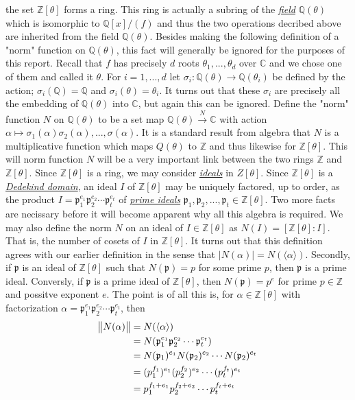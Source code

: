 \documentclass[10pt,a4paper]{article}
\theoremstyle{plain}
\theoremstyle{definition}
\theoremstyle{remark}
\newcommand{\Q}{\mathbb{Q}}
\newcommand{\Z}{\mathbb{Z}}
\begin{document}
    the set $\Z[\theta]$ forms a ring. This ring is actually a subring of the \hyperref[field]{\textit{field}} $\Q(\theta)$ which is isomorphic to $\Q[x]/(f)$ and thus the two operations decribed above are inherited from the field $\Q(\theta)$. Besides making the following definition of a "norm" function on $\Q(\theta)$, this fact will generally be ignored for the purposes of this report. Recall that $f$ has precisely $d$ roots $\theta_1, ... , \theta_d$ over $\mathbb{C}$ and we chose one of them and called it $\theta$. For $i = 1,...,d$ let $\sigma_i : \Q(\theta) \longrightarrow \Q(\theta_i)$ be defined by the action; $\sigma_i(\Q) = \Q$ and $\sigma_i(\theta) = \theta_i$. It turns out that these $\sigma_i$ are precisely all the embedding of $\Q(\theta) $ into $\mathbb{C}$, but again this can be ignored. Define the "norm" function $N$ on $\Q(\theta)$ to be a set map $\Q(\theta) \overset{N}{\longrightarrow} \mathbb{C}$ with action $\alpha \mapsto \sigma_1(\alpha) \sigma_2(\alpha), ... , \sigma(\alpha)$. It is a standard result from algebra that $N$ is a multiplicative function which maps $Q(\theta)$ to $\Z$ and thus likewise for $\Z[\theta]$. This will norm function $N$ will be a very important link between the two rings $\Z$ and $\Z[\theta]$. Since $\Z[\theta]$ is a ring, we may consider \hyperref[ideal]{\textit{ideals}} in $Z[\theta]$. Since $\Z[\theta]$ is a \hyperref[dedekind]{\textit{Dedekind domain}}, an ideal $I$ of $\Z[\theta]$ may be uniquely factored, up to order, as the product $I = \mathfrak{p}_1^{e_1} \mathfrak{p}_2^{e_2} \cdots \mathfrak{p}_t^{e_t}$ of \hyperref[primeideal]{\textit{prime ideals}} $ \mathfrak{p}_1, \mathfrak{p}_2, ... , \mathfrak{p}_t \in \Z[\theta]$. Two more facts are necissary before it will become apparent why all this algebra is required. We may also define the norm $N$ on an ideal of $I \in \mathbb{Z}[\theta]$ as $N(I) = [\mathbb{Z}[\theta]: I]$. That is, the number of cosets of $I$ in $\mathbb{Z}[\theta]$. It turns out that this definition agrees with our earlier definition in the sense that $\mid N(\alpha)\mid  = N(\langle \alpha \rangle )$. Secondly, if $\mathfrak{p}$ is an ideal of $\mathbb{Z}[\theta]$ such that $N(\mathfrak{p}) = p$ for some prime $p$, then $\mathfrak{p}$ is a prime ideal. Conversly, if $\mathfrak{p}$ is a prime ideal of $\mathbb{Z}[\theta]$, then $N(\mathfrak{p}) = p^e$ for prime $p \in \Z$ and possitve exponent $e$. The point is of all this is, for $\alpha \in \mathbb{Z}[\theta]$ with factorization $\alpha = \mathfrak{p}_1^{e_1} \mathfrak{p}_2^{e_2} \cdots \mathfrak{p}_t^{e_t}$, then
    \begin{align*}
      \norm{N(\alpha)} & = N(\langle \alpha \rangle) \\
      &=N(\mathfrak{p}_1^{e_1} \mathfrak{p}_2^{e_2} \cdots \mathfrak{p}_t^{e_t}) \\
      &=N(\mathfrak{p}_1)^{e_1}N(\mathfrak{p}_2)^{e_2} \cdots N(\mathfrak{p}_2)^{e_t} \\
      &=(p_1^{f_1})^{e_1}(p_2^{f_2})^{e_2} \cdots (p_t^{f_t})^{e_t} \\
      &=p_1^{f_1 + e_1}p_2^{f_2 + e_2} \cdots p_t^{f_t + e_t}
    \end{align*}
\end{document}

